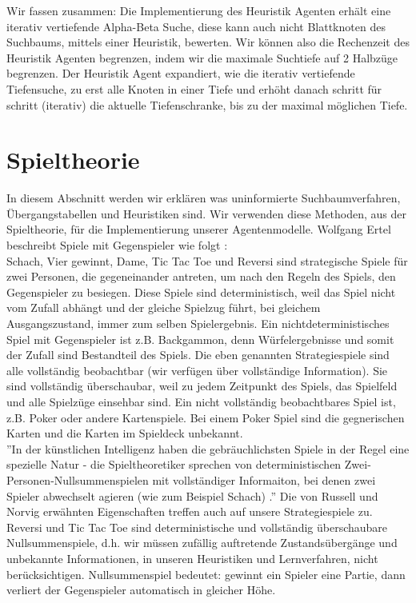 Wir fassen zusammen: Die Implementierung des Heuristik Agenten erhält eine iterativ vertiefende Alpha-Beta Suche, diese kann auch nicht Blattknoten des Suchbaums, mittels einer Heuristik, bewerten. Wir können also die Rechenzeit des Heuristik Agenten begrenzen, indem wir die maximale Suchtiefe auf 2 Halbzüge begrenzen. Der Heuristik Agent expandiert, wie die iterativ vertiefende Tiefensuche, zu erst alle Knoten in einer Tiefe und erhöht danach schritt für schritt (iterativ) die aktuelle Tiefenschranke, bis zu der maximal möglichen Tiefe. 

\section{Spieltheorie}
\label{sec:Spieltheorie}
In diesem Abschnitt werden wir erklären was uninformierte Suchbaumverfahren, Übergangstabellen und Heuristiken sind. Wir verwenden diese Methoden, aus der Spieltheorie, für die Implementierung unserer Agentenmodelle. Wolfgang Ertel beschreibt Spiele mit Gegenspieler wie folgt \cite[114]{Ertel}: \\ 

Schach, Vier gewinnt, Dame, Tic Tac Toe und Reversi sind strategische Spiele für zwei Personen, die gegeneinander antreten, um nach den Regeln des Spiels, den Gegenspieler zu besiegen. Diese Spiele sind deterministisch, weil das Spiel nicht vom Zufall abhängt und der gleiche Spielzug führt, bei gleichem Ausgangszustand, immer zum selben Spielergebnis. Ein nichtdeterministisches Spiel mit Gegenspieler ist z.B. Backgammon, denn Würfelergebnisse und somit der Zufall sind Bestandteil des Spiels. Die eben genannten Strategiespiele sind alle vollständig beobachtbar (wir verfügen über vollständige Information). Sie sind vollständig überschaubar, weil zu jedem Zeitpunkt des Spiels, das Spielfeld und alle Spielzüge einsehbar sind. Ein nicht vollständig beobachtbares Spiel ist, z.B. Poker oder andere Kartenspiele. Bei einem Poker Spiel sind die gegnerischen Karten und die Karten im Spieldeck unbekannt.\\

''In der künstlichen Intelligenz haben die gebräuchlichsten Spiele in der Regel eine spezielle Natur - die Spieltheoretiker sprechen von deterministischen Zwei-Personen-Nullsummenspielen mit vollständiger Informaiton, bei denen zwei Spieler abwechselt agieren (wie zum Beispiel Schach) \cite[206]{Russell}.'' Die von Russell und Norvig erwähnten Eigenschaften treffen auch auf unsere Strategiespiele zu. Reversi und Tic Tac Toe sind deterministische und vollständig überschaubare Nullsummenspiele, d.h. wir müssen zufällig auftretende Zustandsübergänge und unbekannte Informationen, in unseren Heuristiken und Lernverfahren, nicht berücksichtigen. Nullsummenspiel bedeutet: gewinnt ein Spieler eine Partie, dann verliert der Gegenspieler automatisch in gleicher Höhe.

